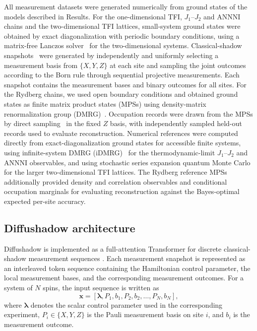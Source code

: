 \documentclass[pdflatex,sn-nature]{sn-jnl}%
\theoremstyle{thmstyleone}%
\theoremstyle{thmstyletwo}%
\theoremstyle{thmstylethree}%
\begin{document}
All measurement datasets were generated numerically from ground states of the models described in Results. For the one-dimensional TFI, $J_1$--$J_2$ and ANNNI chains and the two-dimensional TFI lattices, small-system ground states were obtained by exact diagonalization with periodic boundary conditions, using a matrix-free Lanczos solver~\cite{Lanczos1950} for the two-dimensional systems. Classical-shadow snapshots~\cite{huang2020predicting} were generated by independently and uniformly selecting a measurement basis from \(\{X,Y,Z\}\) at each site and sampling the joint outcomes according to the Born rule through sequential projective measurements. Each snapshot contains the measurement bases and binary outcomes for all sites. For the Rydberg chains, we used open boundary conditions and obtained ground states as finite matrix product states (MPSs) using density-matrix renormalization group (DMRG)~\cite{SCHOLLWOCK201196}. Occupation records were drawn from the MPSs by direct sampling~\cite{PhysRevB.85.165146} in the fixed \(Z\) basis, with independently sampled held-out records used to evaluate reconstruction. Numerical references were computed directly from exact-diagonalization ground states for accessible finite systems, using infinite-system DMRG (iDMRG)~\cite{mcculloch2008infinite} for the thermodynamic-limit $J_1$--$J_2$ and ANNNI observables, and using stochastic series expansion quantum Monte Carlo~\cite{PhysRevE.68.056701} for the larger two-dimensional TFI lattices. The Rydberg reference MPSs additionally provided density and correlation observables and conditional occupation marginals for evaluating reconstruction against the Bayes-optimal expected per-site accuracy.


\subsection{Diffushadow architecture}
\label{sec:method_arch}


Diffushadow is implemented as a full-attention Transformer for discrete classical-shadow measurement sequences \cite{vaswani2017attention, huang2020predicting}. Each measurement snapshot is represented as an interleaved token sequence containing the Hamiltonian control parameter, the local measurement bases, and the corresponding measurement outcomes. For a system of \(N\) spins, the input sequence is written as
\begin{equation}
\mathbf{x}
=
[\boldsymbol{\lambda}, P_1, b_1, P_2, b_2, \ldots, P_N, b_N],
\end{equation}
where \(\boldsymbol{\lambda}\) denotes the scalar control parameter used in the corresponding experiment, \(P_i \in \{X,Y,Z\}\) is the Pauli measurement basis on site \(i\), and \(b_i\) is the measurement outcome. 
\end{document}
